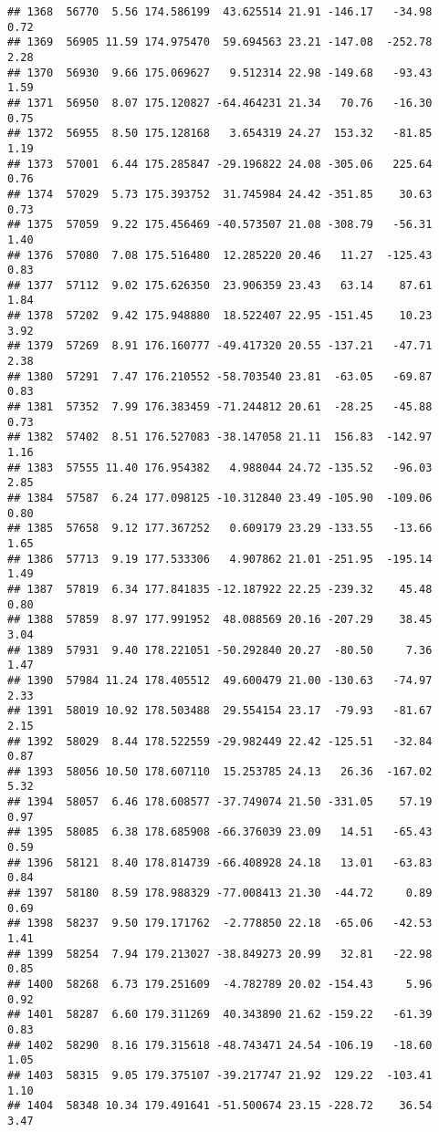 \documentclass[]{article}
\begin{document}
\begin{verbatim}
## 1368  56770  5.56 174.586199  43.625514 21.91 -146.17   -34.98  0.72
## 1369  56905 11.59 174.975470  59.694563 23.21 -147.08  -252.78  2.28
## 1370  56930  9.66 175.069627   9.512314 22.98 -149.68   -93.43  1.59
## 1371  56950  8.07 175.120827 -64.464231 21.34   70.76   -16.30  0.75
## 1372  56955  8.50 175.128168   3.654319 24.27  153.32   -81.85  1.19
## 1373  57001  6.44 175.285847 -29.196822 24.08 -305.06   225.64  0.76
## 1374  57029  5.73 175.393752  31.745984 24.42 -351.85    30.63  0.73
## 1375  57059  9.22 175.456469 -40.573507 21.08 -308.79   -56.31  1.40
## 1376  57080  7.08 175.516480  12.285220 20.46   11.27  -125.43  0.83
## 1377  57112  9.02 175.626350  23.906359 23.43   63.14    87.61  1.84
## 1378  57202  9.42 175.948880  18.522407 22.95 -151.45    10.23  3.92
## 1379  57269  8.91 176.160777 -49.417320 20.55 -137.21   -47.71  2.38
## 1380  57291  7.47 176.210552 -58.703540 23.81  -63.05   -69.87  0.83
## 1381  57352  7.99 176.383459 -71.244812 20.61  -28.25   -45.88  0.73
## 1382  57402  8.51 176.527083 -38.147058 21.11  156.83  -142.97  1.16
## 1383  57555 11.40 176.954382   4.988044 24.72 -135.52   -96.03  2.85
## 1384  57587  6.24 177.098125 -10.312840 23.49 -105.90  -109.06  0.80
## 1385  57658  9.12 177.367252   0.609179 23.29 -133.55   -13.66  1.65
## 1386  57713  9.19 177.533306   4.907862 21.01 -251.95  -195.14  1.49
## 1387  57819  6.34 177.841835 -12.187922 22.25 -239.32    45.48  0.80
## 1388  57859  8.97 177.991952  48.088569 20.16 -207.29    38.45  3.04
## 1389  57931  9.40 178.221051 -50.292840 20.27  -80.50     7.36  1.47
## 1390  57984 11.24 178.405512  49.600479 21.00 -130.63   -74.97  2.33
## 1391  58019 10.92 178.503488  29.554154 23.17  -79.93   -81.67  2.15
## 1392  58029  8.44 178.522559 -29.982449 22.42 -125.51   -32.84  0.87
## 1393  58056 10.50 178.607110  15.253785 24.13   26.36  -167.02  5.32
## 1394  58057  6.46 178.608577 -37.749074 21.50 -331.05    57.19  0.97
## 1395  58085  6.38 178.685908 -66.376039 23.09   14.51   -65.43  0.59
## 1396  58121  8.40 178.814739 -66.408928 24.18   13.01   -63.83  0.84
## 1397  58180  8.59 178.988329 -77.008413 21.30  -44.72     0.89  0.69
## 1398  58237  9.50 179.171762  -2.778850 22.18  -65.06   -42.53  1.41
## 1399  58254  7.94 179.213027 -38.849273 20.99   32.81   -22.98  0.85
## 1400  58268  6.73 179.251609  -4.782789 20.02 -154.43     5.96  0.92
## 1401  58287  6.60 179.311269  40.343890 21.62 -159.22   -61.39  0.83
## 1402  58290  8.16 179.315618 -48.743471 24.54 -106.19   -18.60  1.05
## 1403  58315  9.05 179.375107 -39.217747 21.92  129.22  -103.41  1.10
## 1404  58348 10.34 179.491641 -51.500674 23.15 -228.72    36.54  3.47

\end{verbatim}
\end{document}

